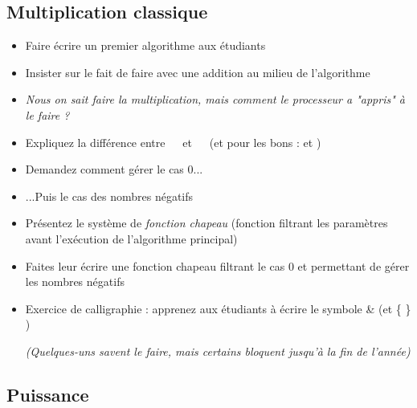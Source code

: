 \documentclass[11pt,a4paper]{article}
\begin{document}
\subsection{Multiplication classique}

\bigskip

\begin{itemize}
\item Faire écrire un premier algorithme aux étudiants
\item Insister sur le fait de faire avec une addition au milieu de l'algorithme
\item \textit{Nous on sait faire la multiplication, mais comment le processeur a "appris" à le faire ?}
\item Expliquez la différence entre $ \; $  $ \; $ et $\; $  $ \; $ (et pour les bons :  et )
\end{itemize}

\medskip

\begin{itemize}
\item Demandez comment gérer le cas 0...
\item ...Puis le cas des nombres négatifs
\item Présentez le système de \textit{fonction chapeau} (fonction filtrant les paramètres avant l'exécution de l'algorithme principal)
\item Faites leur écrire une fonction chapeau filtrant le cas 0 et permettant de gérer les nombres négatifs
\end{itemize}

\medskip

\begin{itemize}
\item Exercice de calligraphie : apprenez aux étudiants à écrire le symbole \og \& \fg{} (et \og \{ \fg{} \og \} \fg{})

\textit{(Quelques-uns savent le faire, mais certains bloquent jusqu'à la fin de l'année)}
\end{itemize}

\bigskip


\subsection{Puissance}
\end{document}
